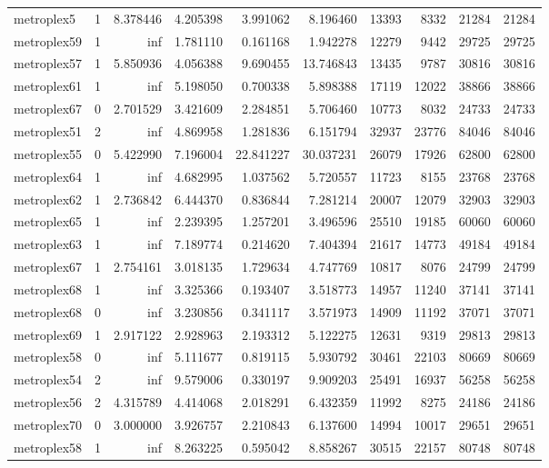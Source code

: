 \begin{longtable}{|l|r|r|r|r|r|r|r|r|r|}
metroplex5 & 1 & 8.378446 & 4.205398 & 3.991062 & 8.196460 & 13393 & 8332 & 21284 & 21284 \\
metroplex59 & 1 & inf & 1.781110 & 0.161168 & 1.942278 & 12279 & 9442 & 29725 & 29725 \\
metroplex57 & 1 & 5.850936 & 4.056388 & 9.690455 & 13.746843 & 13435 & 9787 & 30816 & 30816 \\
metroplex61 & 1 & inf & 5.198050 & 0.700338 & 5.898388 & 17119 & 12022 & 38866 & 38866 \\
metroplex67 & 0 & 2.701529 & 3.421609 & 2.284851 & 5.706460 & 10773 & 8032 & 24733 & 24733 \\
metroplex51 & 2 & inf & 4.869958 & 1.281836 & 6.151794 & 32937 & 23776 & 84046 & 84046 \\
metroplex55 & 0 & 5.422990 & 7.196004 & 22.841227 & 30.037231 & 26079 & 17926 & 62800 & 62800 \\
metroplex64 & 1 & inf & 4.682995 & 1.037562 & 5.720557 & 11723 & 8155 & 23768 & 23768 \\
metroplex62 & 1 & 2.736842 & 6.444370 & 0.836844 & 7.281214 & 20007 & 12079 & 32903 & 32903 \\
metroplex65 & 1 & inf & 2.239395 & 1.257201 & 3.496596 & 25510 & 19185 & 60060 & 60060 \\
metroplex63 & 1 & inf & 7.189774 & 0.214620 & 7.404394 & 21617 & 14773 & 49184 & 49184 \\
metroplex67 & 1 & 2.754161 & 3.018135 & 1.729634 & 4.747769 & 10817 & 8076 & 24799 & 24799 \\
metroplex68 & 1 & inf & 3.325366 & 0.193407 & 3.518773 & 14957 & 11240 & 37141 & 37141 \\
metroplex68 & 0 & inf & 3.230856 & 0.341117 & 3.571973 & 14909 & 11192 & 37071 & 37071 \\
metroplex69 & 1 & 2.917122 & 2.928963 & 2.193312 & 5.122275 & 12631 & 9319 & 29813 & 29813 \\
metroplex58 & 0 & inf & 5.111677 & 0.819115 & 5.930792 & 30461 & 22103 & 80669 & 80669 \\
metroplex54 & 2 & inf & 9.579006 & 0.330197 & 9.909203 & 25491 & 16937 & 56258 & 56258 \\
metroplex56 & 2 & 4.315789 & 4.414068 & 2.018291 & 6.432359 & 11992 & 8275 & 24186 & 24186 \\
metroplex70 & 0 & 3.000000 & 3.926757 & 2.210843 & 6.137600 & 14994 & 10017 & 29651 & 29651 \\
metroplex58 & 1 & inf & 8.263225 & 0.595042 & 8.858267 & 30515 & 22157 & 80748 & 80748 \\

\end{longtable}
